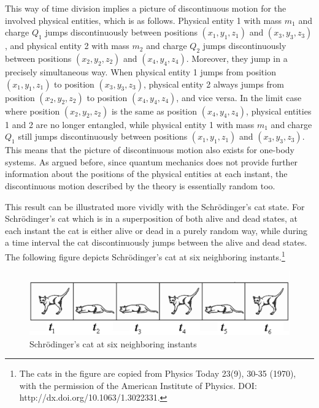 
This way of time division implies a picture of discontinuous motion for the involved physical entities, which is as follows. Physical entity 1 with mass $m_1$ and charge $Q_1$ jumps discontinuously between positions $(x_1,y_1,z_1)$ and $(x_3, y_3, z_3)$, and physical entity 2 with mass $m_2$ and charge $Q_2$ jumps discontinuously between positions $(x_2,y_2,z_2)$ and $(x_4, y_4, z_4)$. Moreover, they jump in a precisely simultaneous way. When physical entity 1 jumps from position $(x_1,y_1,z_1)$ to position $(x_3, y_3, z_3)$, physical entity 2 always jumps from position $(x_2,y_2,z_2)$ to position $(x_4, y_4, z_4)$, and vice versa.  In the limit case where position $(x_2,y_2,z_2)$ is the same as position $(x_4, y_4, z_4)$, physical entities 1 and 2 are no longer entangled, while physical entity 1 with mass $m_1$ and charge $Q_1$ still jumps discontinuously between positions $(x_1,y_1,z_1)$ and $(x_3, y_3, z_3)$. This means that the picture of discontinuous motion also exists for one-body systems. As argued before, since quantum mechanics does not provide further information about the positions of the physical entities at each instant, the discontinuous motion described by the theory is  essentially random too.

This result can be illustrated more vividly with the Schr\"{o}dinger's cat state. For Schr\"{o}dinger's cat which is in a superposition of both alive and dead states, at each instant the cat is either alive or dead in a purely random way, while during a time interval the cat discontinuously jumps between the alive and dead states. The following figure depicts Schr\"{o}dinger's cat at six neighboring instants.\footnote{The cats in the figure are copied from Physics Today 23(9), 30-35 (1970), with the permission of the American Institute of Physics. DOI: http://dx.doi.org/10.1063/1.3022331.}

\begin{center} 
\begin{figure}[h]\label{schcat}

\includegraphics[scale=0.15]{fig72.jpg}


\caption{Schr\"{o}dinger's cat at six neighboring instants}

\end{figure}

 \end{center} 

